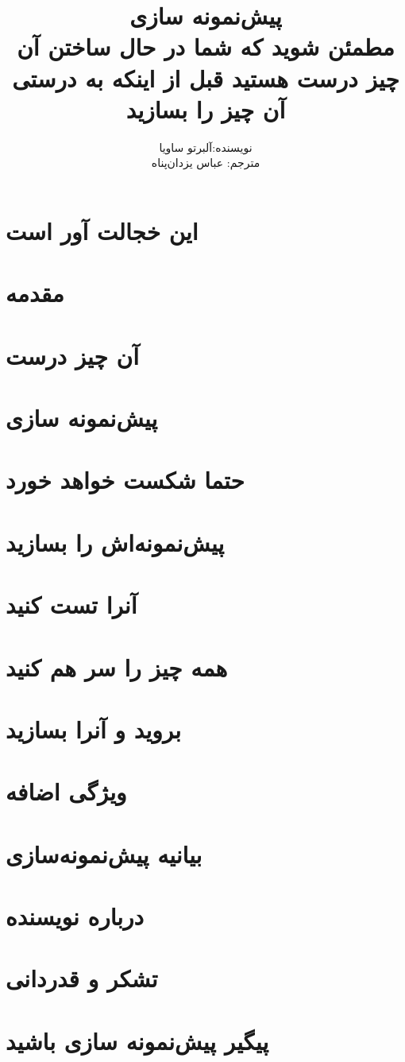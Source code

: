 \documentclass[a5paper,10pt]{book}
\author{نویسنده:آلبرتو ساویا
\\ مترجم: عباس یزدان‌پناه}
\title{پیش‌نمونه سازی
\\
مطمئن شوید که شما در حال ساختن  آن چیز درست هستید قبل از اینکه به درستی آن چیز را بسازید}
\begin{document}
\maketitle
\frontmatter
\tableofcontents

\chapter{این خجالت آور است}

\chapter{مقدمه}

\mainmatter
\chapter{آن چیز درست}

\chapter{پیش‌نمونه سازی}

\chapter{حتما شکست خواهد خورد}

\chapter{پیش‌نمونه‌اش را بسازید}

\chapter{‌آنرا تست کنید}

\chapter{همه چیز را سر هم کنید}

\chapter{بروید و آنرا بسازید}

\chapter{ویژگی اضافه}

\chapter*{بیانیه پیش‌نمونه‌سازی}

\chapter*{درباره نویسنده}

\chapter*{تشکر و قدردانی}

\chapter*{پیگیر پیش‌نمونه سازی باشید}

\end{document}
